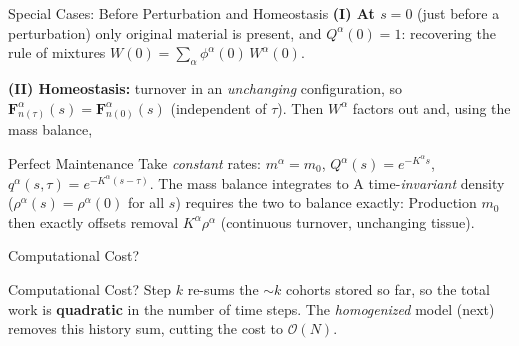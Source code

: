 \begin{frame}[t]{Special Cases: Before Perturbation and Homeostasis}
  \textbf{(I) At $s=0$} (just before a perturbation) only original material is
  present, and $Q^{\alpha}(0)=1$:
  recovering the rule of mixtures $W(0)=\sum_{\alpha}\phi^{\alpha}(0)\,W^{\alpha}(0)$.
  \par\medskip
  \textbf{(II) Homeostasis:} turnover in an \emph{unchanging} configuration, so
  $\bm{F}^{\alpha}_{n(\tau)}(s)=\bm{F}^{\alpha}_{n(0)}(s)$ (independent of $\tau$).
  Then $W^{\alpha}$ factors out and, using the mass balance,
\end{frame}

\begin{frame}[t]{Perfect Maintenance}
  Take \emph{constant} rates: $m^{\alpha}=m_0$, $Q^{\alpha}(s)=e^{-K^{\alpha}s}$,
  $q^{\alpha}(s,\tau)=e^{-K^{\alpha}(s-\tau)}$. The mass balance integrates to
  A time-\emph{invariant} density ($\rho^{\alpha}(s)=\rho^{\alpha}(0)$ for all $s$)
  requires the two to balance exactly:
  Production $m_0$ then exactly offsets removal $K^{\alpha}\rho^{\alpha}$ (continuous turnover, unchanging tissue).
\end{frame}

\begin{frame}[t]{}
  \begin{yourturnbox}{Computational Cost?}
  \end{yourturnbox}
  \vspace{0.6em}
  \srev
  \begin{answerbox}{Computational Cost?}
    Step $k$ re-sums the $\sim k$ cohorts stored so far, so the total work is
    \textbf{quadratic} in the number of time steps. The \emph{homogenized}
    model (next) removes this history sum, cutting the cost to $\mathcal{O}(N)$.
  \end{answerbox}
\end{frame}


